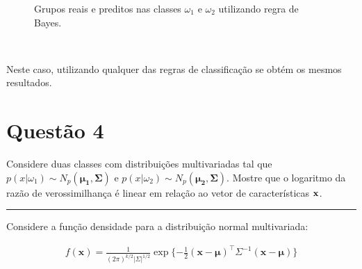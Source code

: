 \documentclass[
  a4paperpaper,
]{article}
\begin{document}
\begin{figure}[H]


\caption{\label{fig-classificacoesbayes}Grupos reais e preditos nas
classes \(\omega_1\) e \(\omega_2\) utilizando regra de Bayes.}

\end{figure}%

~

Neste caso, utilizando qualquer das regras de classificação se obtém os
mesmos resultados.

\newpage{}

\section{Questão 4}\label{questuxe3o-4}

Considere duas classes com distribuições multivariadas tal que
\(p(x|\omega_1) \sim N_p (\boldsymbol{\mu_1} , \boldsymbol{\Sigma})\) e
\(p(x|\omega_2) \sim N_p (\boldsymbol{\mu_2} , \boldsymbol{\Sigma})\).
Mostre que o logaritmo da razão de verossimilhança é linear em relação
ao vetor de características \(\bf{x}\).

\begin{center}\rule{0.5\linewidth}{0.5pt}\end{center}

Considere a função densidade para a distribuição normal multivariada:

\begin{align}
  f(\boldsymbol{x}) = \frac{1}{(2\pi)^{k/2}|\Sigma|^{1/2}} \exp \{ -\frac{1}{2} (\boldsymbol{x} - \boldsymbol{\mu})^\top \Sigma^{-1} (\boldsymbol{x} - \boldsymbol{\mu}) \}
\end{align}
\end{document}
